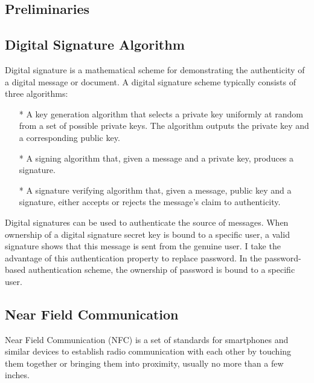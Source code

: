 \begin{CJK}{Bg5}{bsmi}


\chapter{Preliminaries}

\section{Digital Signature Algorithm}

Digital signature is a mathematical scheme for demonstrating the authenticity of a digital message or document. A digital signature scheme typically consists of three algorithms:

\begin{enumerate}
\item[*] A key generation algorithm that selects a private key uniformly at random from a set of possible private keys. The algorithm outputs the private key and a corresponding public key.
\item[*] A signing algorithm that, given a message and a private key, produces a signature.
\item[*] A signature verifying algorithm that, given a message, public key and a signature, either accepts or rejects the message's claim to authenticity.
\end{enumerate}

Digital signatures can be used to authenticate the source of messages. When ownership of a digital signature secret key is bound to a specific user, a valid signature shows that this message is sent from the genuine user. I take the advantage of this authentication property to replace password. In the password-based authentication scheme, the ownership of password is bound to a specific user. 

\section{Near Field Communication}

Near Field Communication (NFC)\cite{nfc-wiki} is a set of standards for smartphones and similar devices to establish radio communication with each other by touching them together or bringing them into proximity, usually no more than a few inches.


\end{CJK}
